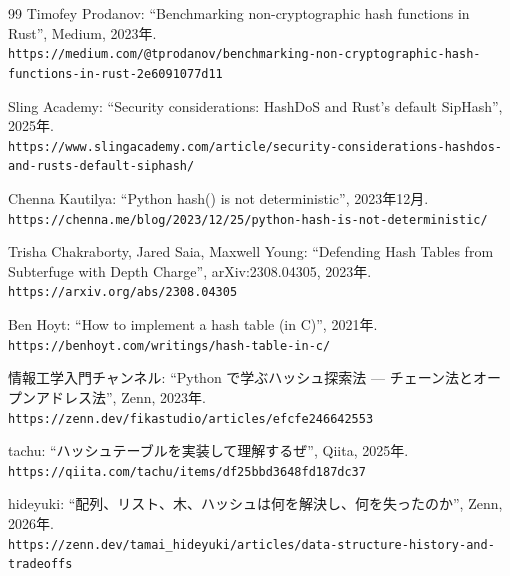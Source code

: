 \begin{thebibliography}{99}
Timofey Prodanov:
``Benchmarking non-cryptographic hash functions in Rust'', Medium, 2023年.\\
{\small\tt https://medium.com/@tprodanov/benchmarking-non-cryptographic-hash-functions-in-rust-2e6091077d11}

Sling Academy:
``Security considerations: HashDoS and Rust's default SipHash'', 2025年.\\
{\small\tt https://www.slingacademy.com/article/security-considerations-hashdos-and-rusts-default-siphash/}

Chenna Kautilya:
``Python hash() is not deterministic'', 2023年12月.\\
{\small\tt https://chenna.me/blog/2023/12/25/python-hash-is-not-deterministic/}

Trisha Chakraborty, Jared Saia, Maxwell Young:
``Defending Hash Tables from Subterfuge with Depth Charge'', arXiv:2308.04305, 2023年.\\
{\small\tt https://arxiv.org/abs/2308.04305}

Ben Hoyt:
``How to implement a hash table (in C)'', 2021年.\\
{\small\tt https://benhoyt.com/writings/hash-table-in-c/}

情報工学入門チャンネル:
``Python で学ぶハッシュ探索法 --- チェーン法とオープンアドレス法'', Zenn, 2023年.\\
{\small\tt https://zenn.dev/fikastudio/articles/efcfe246642553}

tachu:
``ハッシュテーブルを実装して理解するぜ'', Qiita, 2025年.\\
{\small\tt https://qiita.com/tachu/items/df25bbd3648fd187dc37}

hideyuki:
``配列、リスト、木、ハッシュは何を解決し、何を失ったのか'', Zenn, 2026年.\\
{\small\tt https://zenn.dev/tamai\_hideyuki/articles/data-structure-history-and-tradeoffs}

\end{thebibliography}
